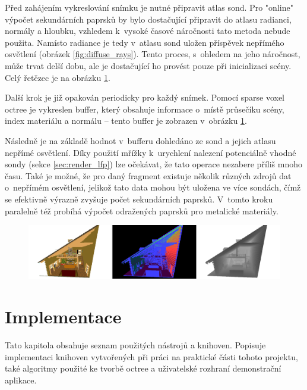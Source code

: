 Před zahájením vykreslování snímku je nutné připravit atlas sond. Pro "online" výpočet sekundárních paprsků by bylo dostačující připravit do atlasu radianci, normály a hloubku, vzhledem k~vysoké časové náročnosti tato metoda nebude použita. Namísto radiance je tedy v~atlasu sond uložen příspěvek nepřímého osvětlení (obrázek \ref{fig:diffuse_rays}). Tento proces, s~ohledem na jeho náročnost, může trvat delší dobu, ale je dostačující ho provést pouze při inicializaci scény. Celý řetězec je na obrázku \ref{fig:gbuffer_contents}.

Další krok je již opakován periodicky pro každý snímek. Pomocí sparse voxel octree je vykreslen buffer, který obsahuje informace o~místě průsečíku scény, index materiálu a normálu -- tento buffer je zobrazen v~obrázku \ref{fig:gbuffer_contents}. 

Následně je na základě hodnot v~bufferu dohledáno ze sond a jejich atlasu nepřímé osvětlení. Díky použití mřížky k~urychlení nalezení potenciálně vhodné sondy (sekce \ref{sec:render_lfp}) lze očekávat, že tato operace nezabere příliš mnoho času. Také je možné, že pro daný fragment existuje několik různých zdrojů dat o~nepřímém osvětlení, jelikož tato data mohou být uložena ve více sondách, čímž se efektivně výrazně zvyšuje počet sekundárních paprsků. V~tomto kroku paralelně též probíhá výpočet odražených paprsků pro metalické materiály.


\begin{figure}[H]
	\centering
	\includegraphics[scale=1]{images/gbuffer_render.png}
	\captionsetup{justification=centering}
	\label{fig:gbuffer_contents}
\end{figure}


\chapter{Implementace}
\label{implementace}

Tato kapitola obsahuje seznam použitých nástrojů a knihoven. Popisuje implementaci knihoven vytvořených při práci na praktické části tohoto projektu, také algoritmy použité ke tvorbě octree a uživatelské rozhraní demonstrační aplikace.

